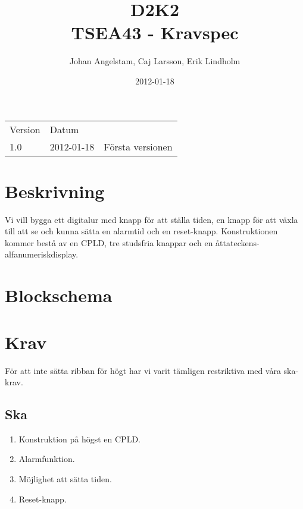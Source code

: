 \documentclass[a4paper,8pt]{article}
\title{\huge{D2K2} \vspace{1cm}\\ 
  \large{TSEA43 - Kravspec}}
\author{Johan Angelstam, Caj Larsson, Erik Lindholm}
\date{2012-01-18}
\begin{document}
\maketitle
\vfill
\begin{tabular}{ l l l }
  Version & Datum & \\
  1.0     & 2012-01-18 & Första versionen \\
\end{tabular}

\thispagestyle{empty}

\pagebreak

\section{Beskrivning}
Vi vill bygga ett digitalur med knapp för att ställa tiden, en
knapp för att växla till att se och kunna sätta en
alarmtid och en reset-knapp. Konstruktionen kommer bestå av en CPLD,
tre studsfria knappar och en åttateckens-alfanumeriskdisplay.

\section{Blockschema}
\begin{figure}[h]
\centering
{}
\end{figure}

\section{Krav}
För att inte sätta ribban för högt har vi varit tämligen restriktiva med våra
 ska-krav.

\subsection{Ska}
\begin{enumerate}
  \item Konstruktion på högst en CPLD.
  \item Alarmfunktion.
  \item Möjlighet att sätta tiden. 
  \item Reset-knapp.
\end{enumerate}
\end{document}

